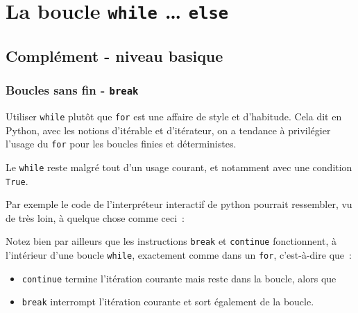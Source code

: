     
    
    
    

    

    \hypertarget{la-boucle-while-else}{%
\section{\texorpdfstring{La boucle \texttt{while} \ldots{}
\texttt{else}}{La boucle while \ldots{} else}}\label{la-boucle-while-else}}

    \hypertarget{compluxe9ment---niveau-basique}{%
\subsection{Complément - niveau
basique}\label{compluxe9ment---niveau-basique}}

    \hypertarget{boucles-sans-fin---break}{%
\subsubsection{\texorpdfstring{Boucles sans fin -
\texttt{break}}{Boucles sans fin - break}}\label{boucles-sans-fin---break}}

    Utiliser \texttt{while} plutôt que \texttt{for} est une affaire de style
et d'habitude. Cela dit en Python, avec les notions d'itérable et
d'itérateur, on a tendance à privilégier l'usage du \texttt{for} pour
les boucles finies et déterministes.

    Le \texttt{while} reste malgré tout d'un usage courant, et notamment
avec une condition \texttt{True}.

Par exemple le code de l'interpréteur interactif de python pourrait
ressembler, vu de très loin, à quelque chose comme ceci~:

\begin{Shaded}
\begin{Highlighting}[frame=lines,framerule=0.6mm,rulecolor=\color{asisframecolor}]
 \NormalTok{:}
    \NormalTok{(}
\end{Highlighting}
\end{Shaded}

    Notez bien par ailleurs que les instructions \texttt{break} et
\texttt{continue} fonctionnent, à l'intérieur d'une boucle
\texttt{while}, exactement comme dans un \texttt{for}, c'est-à-dire
que~:

\begin{itemize}
\tightlist
\item
  \texttt{continue} termine l'itération courante mais reste dans la
  boucle, alors que
\item
  \texttt{break} interrompt l'itération courante et sort également de la
  boucle.
\end{itemize}

